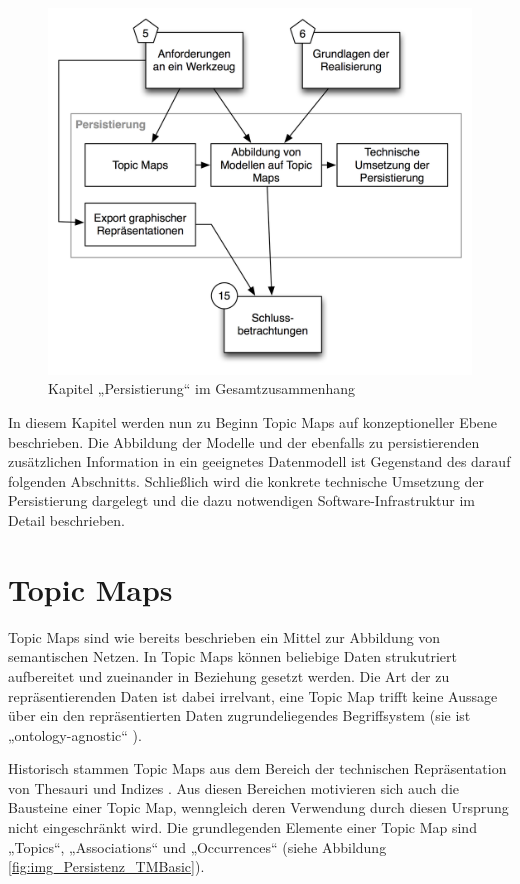 \begin{figure}[htbp]
	\centering
		\includegraphics[scale=0.75]{img/Kontextgrafiken/k9.png}
	\caption{Kapitel „Persistierung“ im Gesamtzusammenhang}
	\label{fig:img_Kontextgrafiken_k9}
\end{figure}

In diesem Kapitel werden nun zu Beginn Topic Maps auf konzeptioneller Ebene beschrieben. Die Abbildung der Modelle und der ebenfalls zu persistierenden zusätzlichen Information in ein geeignetes Datenmodell ist Gegenstand des darauf folgenden Abschnitts. Schließlich wird die konkrete technische Umsetzung der Persistierung dargelegt und die dazu notwendigen Software-Infrastruktur im Detail beschrieben.
 
\section{Topic Maps} %
\label{sec:topic_maps}

Topic Maps \citep{TMDM08} sind wie bereits beschrieben ein Mittel zur Abbildung von semantischen Netzen. In Topic Maps können beliebige Daten strukutriert aufbereitet und zueinander in Beziehung gesetzt werden. Die Art der zu repräsentierenden Daten ist dabei irrelvant, eine Topic Map trifft keine Aussage über ein den repräsentierten Daten zugrundeliegendes Begriffsystem (sie ist „ontology-agnostic“ \citep{Vatant04}).

Historisch stammen Topic Maps aus dem Bereich der technischen Repräsentation von Thesauri und Indizes \citep{Pepper00} \citep{Rath03}. Aus diesen Bereichen motivieren sich auch die Bausteine einer Topic Map, wenngleich deren Verwendung durch diesen Ursprung nicht eingeschränkt wird. Die grundlegenden Elemente einer Topic Map sind „Topics“, „Associations“ und „Occurrences“ (siehe Abbildung \ref{fig:img_Persistenz_TMBasic}). 

